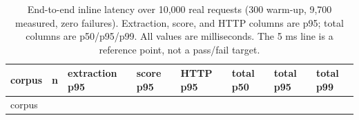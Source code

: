 \documentclass[preprint,11pt]{elsarticle}
\begin{document}
{
\begingroup\scriptsize\setlength{\tabcolsep}{2pt}
\begin{longtable}[]{@{}
  >{\raggedright\arraybackslash}p{}
  >{\raggedleft\arraybackslash}p{}
  >{\raggedleft\arraybackslash}p{}
  >{\raggedleft\arraybackslash}p{}
  >{\raggedleft\arraybackslash}p{}
  >{\raggedleft\arraybackslash}p{}
  >{\raggedleft\arraybackslash}p{}
  >{\raggedleft\arraybackslash}p{}@{}}
\caption{End-to-end inline latency over 10,000 real requests
(300 warm-up, 9,700 measured, zero failures). Extraction, score, and
HTTP columns are p95; total columns are p50/p95/p99. All values are
milliseconds. The 5 ms line is a reference point, not a pass/fail
target.}\label{tab:latency}\\
\toprule\noalign{}
\begin{minipage}[t]{\linewidth}\raggedright
corpus
\end{minipage} & \begin{minipage}[t]{\linewidth}\raggedleft
n
\end{minipage} & \begin{minipage}[t]{\linewidth}\raggedleft
extraction p95
\end{minipage} & \begin{minipage}[t]{\linewidth}\raggedleft
score p95
\end{minipage} & \begin{minipage}[t]{\linewidth}\raggedleft
HTTP p95
\end{minipage} & \begin{minipage}[t]{\linewidth}\raggedleft
total p50
\end{minipage} & \begin{minipage}[t]{\linewidth}\raggedleft
total p95
\end{minipage} & \begin{minipage}[t]{\linewidth}\raggedleft
total p99
\end{minipage} \\
\midrule\noalign{}
\endfirsthead
\toprule\noalign{}
\begin{minipage}[t]{\linewidth}\raggedright
corpus
\end{minipage} & \begin{minipage}[t]{\linewidth}\raggedleft

\end{minipage}
\end{longtable}}
\end{document}
